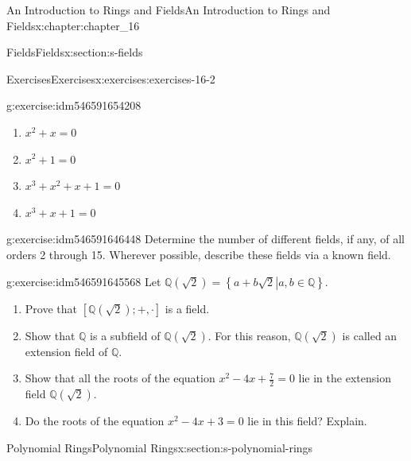 \documentclass[oneside,10pt,]{book}
\numberwithin{equation}{section}
\begin{document}
\begin{chapterptx}{An Introduction to Rings and Fields}{}{An Introduction to Rings and Fields}{}{}{x:chapter:chapter_16}
\begin{sectionptx}{Fields}{}{Fields}{}{}{x:section:s-fields}
\begin{exercises-subsection}{Exercises}{}{Exercises}{}{}{x:exercises:exercises-16-2}
\begin{divisionexercise}{7}{}{}{g:exercise:idm546591654208}
\begin{multicols}{2}
\begin{enumerate}[label=(\alph*)]
\item{}\(x^2 + x = 0\)%
\item{}\(x^2 + 1 = 0\)%
\item{}\(x^3 + x^2 + x + 1 = 0\)%
\item{}\(x^3 + x + 1 = 0\)%
\end{enumerate}
\end{multicols}
%
\end{divisionexercise}%
\begin{divisionexercise}{8}{}{}{g:exercise:idm546591646448}%
Determine the number of different fields, if any, of all orders 2 through 15. Wherever possible, describe these fields via a known field.%
\end{divisionexercise}%
\begin{divisionexercise}{9}{}{}{g:exercise:idm546591645568}%
Let \(\mathbb{Q}\left(\sqrt{2}\right) = \left\{\left.a + b\sqrt{2}\right| a, b \in  \mathbb{Q}\right\}\).%
\begin{enumerate}[label=(\alph*)]
\item{}Prove that \(\left[\mathbb{Q}\left(\sqrt{2}\right); +, \cdot \right]\) is a field.%
\item{}Show that \(\mathbb{Q}\) is a subfield of \(\mathbb{Q}\left(\sqrt{2}\right)\). For this reason, \(\mathbb{Q}\left(\sqrt{2}\right)\) is called an extension field of \(\mathbb{Q}\).%
\item{}Show that all the roots of the equation \(x^2 - 4x+\frac{7}{2} = 0\) lie in the extension field \(\mathbb{Q}\left(\sqrt{2}\right)\).%
\item{}Do the roots of the equation \(x^2 -4 x+ 3 = 0\) lie in this field? Explain.%
\end{enumerate}
%
\end{divisionexercise}%
\end{exercises-subsection}
\end{sectionptx}
%
%
\typeout{************************************************}
\typeout{************************************************}
%
\begin{sectionptx}{Polynomial Rings}{}{Polynomial Rings}{}{}{x:section:s-polynomial-rings}

\end{sectionptx}
\end{chapterptx}
\end{document}

